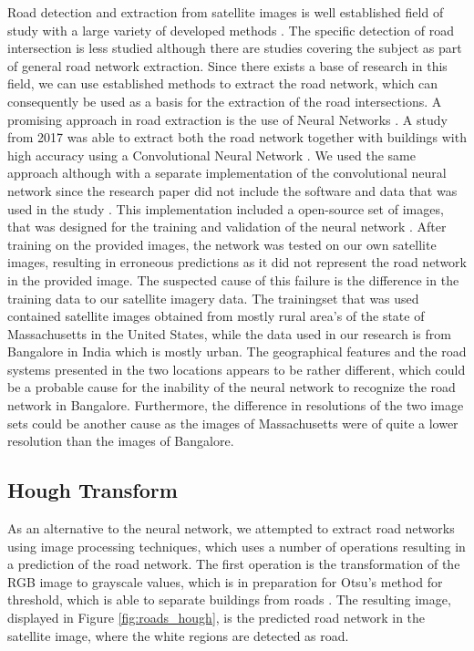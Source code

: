 Road detection and extraction from satellite images is well established field of study with a large variety of developed methods \cite{mena2003state}.  The specific detection of road intersection is less studied although there are studies covering the subject \cite{hu2007road} \cite{koutaki2004automatic} as part of general road network extraction. Since there exists a base of research in this field, we can use established methods to extract the road network, which can consequently be used as a basis for the extraction of the road intersections. 
A promising approach in road extraction is the use of Neural Networks \cite{mangala2011extraction} \cite{mokhtarzade2007road}. A study from 2017 was able to extract both the road network together with buildings with high accuracy using a Convolutional Neural Network \cite{alshehhi2017simultaneous}. We used the same approach although with a separate implementation of the convolutional neural network since the research paper did not include the software and data that was used in the study \cite{airs}. This implementation included a open-source set of images, that was designed for the training and validation of the neural network \cite{MnihThesis}. After training on the provided images, the network was tested on our own satellite images, resulting in erroneous predictions as it did not represent the road network in the provided image. The suspected cause of this failure is the difference in the training data to our satellite imagery data. The trainingset that was used contained satellite images obtained from mostly rural area's of the state of Massachusetts in the United States, while the data used in our research is from Bangalore in India which is mostly urban. The geographical features and the road systems presented in the two locations appears to be rather different, which could be a probable cause for the inability of the neural network to recognize the road network in Bangalore. Furthermore, the difference in resolutions of the two image sets could be another cause as the images of Massachusetts were of quite a lower resolution than the images of Bangalore.

\subsection{Hough Transform}
As an alternative to the neural network, we attempted to extract road networks using image processing techniques, which uses a number of operations resulting in a prediction of the road network. The first operation is the transformation of the RGB image to grayscale values, which is in preparation for Otsu's method for threshold, which is able to separate buildings from roads \cite{otsu1979threshold}. The resulting image, displayed in Figure \ref{fig:roads_hough}, is the predicted road network in the satellite image, where the white regions are detected as road. 

